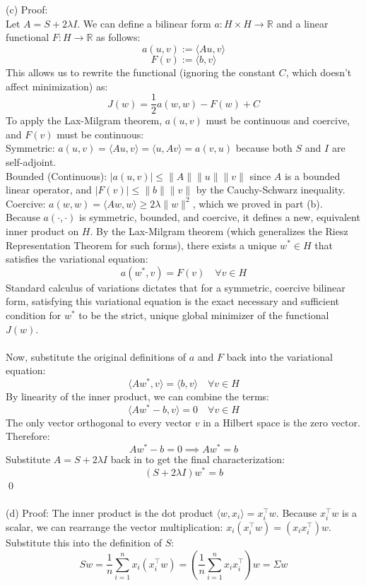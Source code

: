 \documentclass{article}
\begin{document}
\\
\\
(c) Proof: 
\\
Let $A = S + 2\lambda I$. We can define a bilinear form $a: H \times H \to \mathbb{R}$ and a linear functional $F: H \to \mathbb{R}$ as follows:$$a(u, v) := \langle Au, v \rangle$$$$F(v) := \langle b, v \rangle$$This allows us to rewrite the functional (ignoring the constant $C$, which doesn't affect minimization) as:$$J(w) = \frac{1}{2}a(w, w) - F(w) + C$$ To apply the Lax-Milgram theorem, $a(u, v)$ must be continuous and coercive, and $F(v)$ must be continuous:
\\
Symmetric: $a(u, v) = \langle Au, v \rangle = \langle u, Av \rangle = a(v, u)$ because both $S$ and $I$ are self-adjoint.
\\
Bounded (Continuous): $|a(u, v)| \leq \|A\| \|u\| \|v\|$ since $A$ is a bounded linear operator, and $|F(v)| \leq \|b\| \|v\|$ by the Cauchy-Schwarz inequality.
\\
Coercive: $a(w, w) = \langle Aw, w \rangle \geq 2\lambda\|w\|^2$, which we proved in part (b).
\\
Because $a(\cdot, \cdot)$ is symmetric, bounded, and coercive, it defines a new, equivalent inner product on $H$. By the Lax-Milgram theorem (which generalizes the Riesz Representation Theorem for such forms), there exists a unique $w^* \in H$ that satisfies the variational equation:$$a(w^*, v) = F(v) \quad \forall v \in H$$Standard calculus of variations dictates that for a symmetric, coercive bilinear form, satisfying this variational equation is the exact necessary and sufficient condition for $w^*$ to be the strict, unique global minimizer of the functional $J(w)$.
\\
\\
Now, substitute the original definitions of $a$ and $F$ back into the variational equation:$$\langle Aw^*, v \rangle = \langle b, v \rangle \quad \forall v \in H$$By linearity of the inner product, we can combine the terms:$$\langle Aw^* - b, v \rangle = 0 \quad \forall v \in H$$The only vector orthogonal to every vector $v$ in a Hilbert space is the zero vector. Therefore:$$Aw^* - b = 0 \implies Aw^* = b$$Substitute $A = S + 2\lambda I$ back in to get the final characterization:$$(S + 2\lambda I)w^* = b$$ \qed
\\
\\
(d) Proof: The inner product is the dot product $\langle w, x_i \rangle = x_i^\top w$. Because $x_i^\top w$ is a scalar, we can rearrange the vector multiplication: $x_i(x_i^\top w) = (x_i x_i^\top)w$. Substitute this into the definition of $S$:$$Sw = \frac{1}{n} \sum_{i=1}^n x_i(x_i^\top w) = \left( \frac{1}{n} \sum_{i=1}^n x_i x_i^\top \right) w = \Sigma w$$
\end{document}
